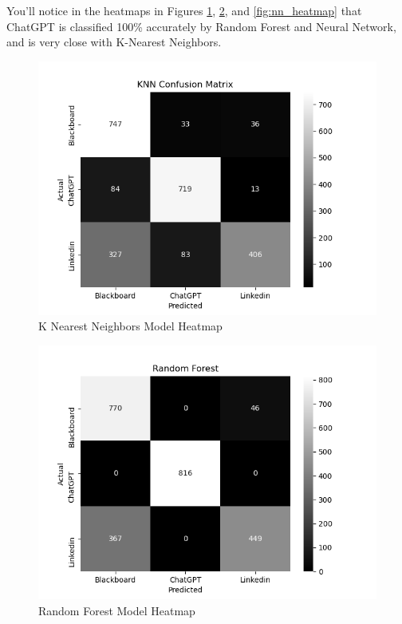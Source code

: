 \documentclass[10pt,sigconf,letterpaper,nonacm]{acmart}
\begin{document}
You'll notice in the heatmaps in Figures \ref{fig:knn_heatmap}, \ref{fig:rf_heatmap}, and \ref{fig:nn_heatmap} that ChatGPT is classified 100\% accurately by Random Forest and Neural Network, and is very close with K-Nearest Neighbors. 

\begin{figure}
    \centering
    \includegraphics[width=1\linewidth]{Figures_and_Graphs/ConfusionMatrixKNN.png}
    \caption{K Nearest Neighbors Model Heatmap}
    \label{fig:knn_heatmap}
\end{figure}

\begin{figure}
    \centering
    \includegraphics[width=1\linewidth]{Figures_and_Graphs/ConfusionMatrixRF.png}
    \caption{Random Forest Model Heatmap}
    \label{fig:rf_heatmap}
\end{figure}
\end{document}
